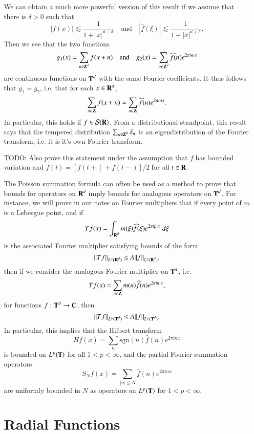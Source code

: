 We can obtain a much more powerful version of this result if we assume that there is $\delta > 0$ such that
%
\[ |f(x)| \lesssim \frac{1}{1 + |x|^{d + \delta}} \quad\text{and}\quad |\widehat{f}(\xi)| \lesssim \frac{1}{1 + |x|^{d + \delta}}. \]
%
Then we see that the two functions
%
\[ g_1(x) = \sum_{n \in \operatorname{\mathbf{Z}}^d} f(x + n) \quad\text{and}\quad g_2(x) = \sum_{n \in \operatorname{\mathbf{Z}}^d} \widehat{f}(n) e^{2 \pi i n \cdot x} \]
%
are continuous functions on $\operatorname{\mathbf{T}}^d$ with the same Fourier coefficients. It thus follows that $g_1 = g_2$, i.e. that for each $x \in \operatorname{\mathbf{R}}^d$,
%
\[ \sum_{n \in \operatorname{\mathbf{Z}}} f(x + n) = \sum_{n \in \operatorname{\mathbf{Z}}} \widehat{f}(n) e^{2 \pi n i x}. \]
%
In particular, this holds if $f \in \mathcal{S}(\operatorname{\mathbf{R}})$. From a distributional standpoint, this result says that the tempered distribution $\sum_{n \in \operatorname{\mathbf{Z}}^d} \delta_n$ is an eigendistribution of the Fourier transform, i.e. it is it's own Fourier transform.

TODO: Also prove this statement under the assumption that $f$ has bounded variation and $f(t) = [f(t+) + f(t-)]/2$ for all $t \in \operatorname{\mathbf{R}}$.

The Poisson summation formula can often be used as a method to prove that bounds for operators on $\operatorname{\mathbf{R}}^d$ imply bounds for analogous operators on $\operatorname{\mathbf{T}}^d$. For instance, we will prove in our notes on Fourier multipliers that if every point of $m$ is a Lebesgue point, and if
%
\[ Tf(x) = \int_{\operatorname{\mathbf{R}}^d} m(\xi) \widehat{f}(\xi) e^{2 \pi i \xi \cdot x}\; d\xi \]
%
is the associated Fourier multiplier satisfying bounds of the form
%
\[ \| Tf \|_{L^p(\operatorname{\mathbf{R}}^d)} \leq A \| f \|_{L^p(\operatorname{\mathbf{R}}^d)}, \]
%
then if we consider the analogous Fourier multiplier on $\operatorname{\mathbf{T}}^d$, i.e.
%
\[ Tf(x) = \sum_{n \in \operatorname{\mathbf{Z}}} m(n) \widehat{f}(n) e^{2 \pi i n \cdot x}, \]
%
for functions $f: \operatorname{\mathbf{T}}^d \to \operatorname{\mathbf{C}}$, then
%
\[ \| T f \|_{L^p(\operatorname{\mathbf{T}}^d)} \leq A \| f \|_{L^p(\operatorname{\mathbf{T}}^d)}. \]
%
In particular, this implies that the Hilbert transform
%
\[ Hf(x) = \sum_n \text{sgn}(n) \widehat{f}(n) e^{2 \pi i n x} \]
%
is bounded on $L^p(\operatorname{\mathbf{T}})$ for all $1 < p < \infty$, and the partial Fourier summation operators
%
\[ S_N f(x) = \sum_{|n| \leq N} \widehat{f}(n) e^{2 \pi i n x} \]
%
are uniformly bounded in $N$ as operators on $L^p(\operatorname{\mathbf{T}})$ for $1 < p < \infty$.

\section{Radial Functions}

